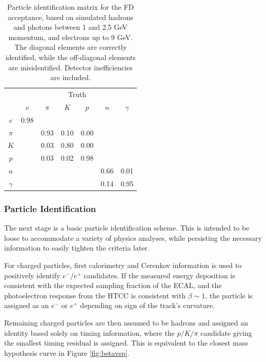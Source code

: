 \begin{table}[htpb]
  \begin{center}
    \begin{tabular}{|c|cccccc|}\hline
          & \multicolumn{6}{c|}{Truth}\\        
          & $e$  & $\pi$ & $K$  & $p$  & $n$  & $\gamma$ \\\hline
  $e$     & 0.98 &       &      &      &      &          \\ 
  $\pi$   &      &  0.93 & 0.10 & 0.00 &      &          \\ 
  $K$     &      &  0.03 & 0.80 & 0.00 &      &          \\ 
  $p$     &      &  0.03 & 0.02 & 0.98 &      &          \\ 
  $n$     &      &       &      &      & 0.66 &   0.01   \\ 
 $\gamma$ &      &       &      &      & 0.14 &   0.95   \\\hline 
    \end{tabular}  
  \caption{Particle identification matrix for the FD acceptance, based on simulated hadrons and photons between 1 and 2.5 GeV momentum, and electrons up to 9 GeV.  The diagonal elements are correctly identified, while the off-diagonal elements are misidentified.  Detector inefficiencies are included.}
  \end{center}
  \label{table:pidmatrix}
\end{table}

\subsubsection{Particle Identification}
The next stage is a basic particle identification scheme.  This is intended to be loose to accommodate a variety of physics analyses, while persisting the necessary information to easily tighten the criteria later.

For charged particles, first calorimetry and Cerenkov information is used to positively identify $e^-/e^+$ candidates.  If the measured energy deposition is consistent with the expected sampling fraction of the ECAL, and the photoelectron response from the HTCC is consistent with $\beta\sim1$, the particle is assigned as an $e^-$ or $e^+$ depending on sign of the track's curvature.

Remaining charged particles are then assumed to be hadrons and assigned an identity based solely on timing information, where the $p/K/\pi$ candidate giving the smallest timing residual is assigned.  This is equivalent to the closest mass hypothesis curve in Figure \ref{fig:betavsp}.

